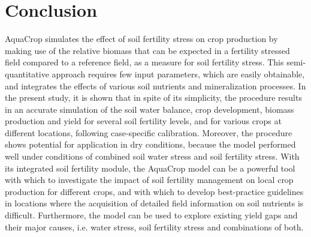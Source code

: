 \section{Conclusion}
AquaCrop simulates the effect of soil fertility stress on crop production by making use of the relative biomass that can be expected in a fertility stressed field compared to a reference field, as a measure for soil fertility stress. This semi-quantitative approach requires few input parameters, which are easily obtainable, and integrates the effects of various soil nutrients and mineralization processes. In the present study, it is shown that in spite of its simplicity, the procedure results in an accurate simulation of the soil water balance, crop development, biomass production and yield for several soil fertility levels, and for various crops at different locations, following case-specific calibration. Moreover, the procedure shows potential for application in dry conditions, because the model performed well under conditions of combined soil water stress and soil fertility stress. With its integrated soil fertility module, the AquaCrop model can be a powerful tool with which to investigate the impact of soil fertility management on local crop production for different crops, and with which to develop best-practice guidelines in locations where the acquisition of detailed field information on soil nutrients is difficult. Furthermore, the model can be used to explore existing yield gaps and their major causes, i.e. water stress, soil fertility stress and combinations of both.

\cleardoublepage